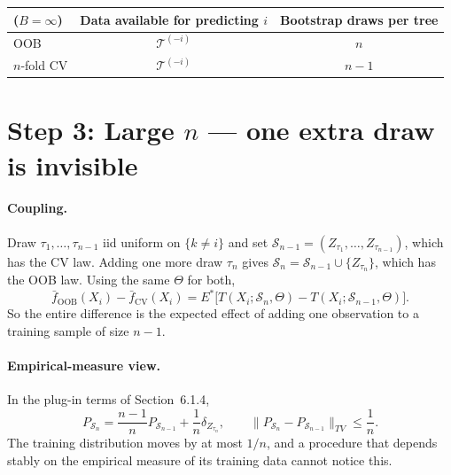\documentclass[11pt,a4paper]{article}
\theoremstyle{remark}
\newcommand{\cT}{\mathcal T}
\newcommand{\cS}{\mathcal S}
\newcommand{\1}{\mathbf 1}
\newcommand{\fOOB}{\bar f_{\mathrm{OOB}}}
\newcommand{\fCV}{\bar f_{\mathrm{CV}}}
\begin{document}
\begin{center}
\begin{tabular}{lcc}
\toprule
($B=\infty$) & Data available for predicting $i$ & Bootstrap draws per tree\\
\midrule
OOB & $\cT^{(-i)}$ & $n$\\
$n$-fold CV & $\cT^{(-i)}$ & $n-1$\\
\bottomrule
\end{tabular}
\end{center}

\section*{Step 3: Large $n$ --- one extra draw is invisible}

\paragraph{Coupling.}
Draw $\tau_1,\dots,\tau_{n-1}$ iid uniform on $\{k\neq i\}$ and set $\cS_{n-1}=(Z_{\tau_1},\dots,Z_{\tau_{n-1}})$, which has the CV law. Adding one more draw $\tau_n$ gives $\cS_n=\cS_{n-1}\cup\{Z_{\tau_n}\}$, which has the OOB law. Using the same $\Theta$ for both,
\[
\fOOB(X_i)-\fCV(X_i)=E^*\big[T(X_i;\cS_n,\Theta)-T(X_i;\cS_{n-1},\Theta)\big].
\]
So the entire difference is the expected effect of adding one observation to a training sample of size $n-1$.

\paragraph{Empirical-measure view.}
In the plug-in terms of Section~6.1.4,
\[
P_{\cS_n}=\frac{n-1}{n}P_{\cS_{n-1}}+\frac1n\delta_{Z_{\tau_n}},
\qquad
\|P_{\cS_n}-P_{\cS_{n-1}}\|_{TV}\le\frac1n.
\]
The training distribution moves by at most $1/n$, and a procedure that depends stably on the empirical measure of its training data cannot notice this.
\end{document}
